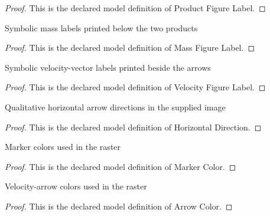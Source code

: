 \begin{proof}
  This is the declared model definition of Product Figure Label.
\end{proof}
\begin{definition}
  \label{def:physics:phyx-mini-0618:phyxminiproblems-problemphyxmini0618-massfigurelabel}
  Symbolic mass labels printed below the two products
\end{definition}
\begin{proof}
  This is the declared model definition of Mass Figure Label.
\end{proof}
\begin{definition}
  \label{def:physics:phyx-mini-0618:phyxminiproblems-problemphyxmini0618-velocityfigurelabel}
  Symbolic velocity-vector labels printed beside the arrows
\end{definition}
\begin{proof}
  This is the declared model definition of Velocity Figure Label.
\end{proof}
\begin{definition}
  \label{def:physics:phyx-mini-0618:phyxminiproblems-problemphyxmini0618-horizontaldirection}
  Qualitative horizontal arrow directions in the supplied image
\end{definition}
\begin{proof}
  This is the declared model definition of Horizontal Direction.
\end{proof}
\begin{definition}
  \label{def:physics:phyx-mini-0618:phyxminiproblems-problemphyxmini0618-markercolor}
  Marker colors used in the raster
\end{definition}
\begin{proof}
  This is the declared model definition of Marker Color.
\end{proof}
\begin{definition}
  \label{def:physics:phyx-mini-0618:phyxminiproblems-problemphyxmini0618-arrowcolor}
  Velocity-arrow colors used in the raster
\end{definition}
\begin{proof}
  This is the declared model definition of Arrow Color.
\end{proof}
